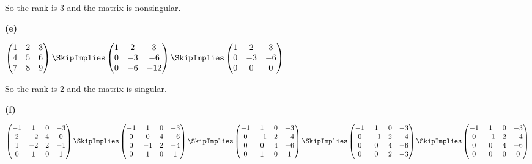\documentclass[oneside,12pt]{amsart}
\begin{document}
\bigskip

So the rank is 3 and the matrix is nonsingular.

\bigskip

\textbf{(e)}

$
\begin{pmatrix}
1 & 2 & 3 \\
4 & 5 & 6 \\
7 & 8 & 9
\end{pmatrix}
\SkipImplies
\begin{pmatrix}
1 & 2 & 3 \\
0 & -3 & -6 \\
0 & -6 & -12
\end{pmatrix}
\SkipImplies
\begin{pmatrix}
1 & 2 & 3 \\
0 & -3 & -6 \\
0 & 0 & 0
\end{pmatrix}
$

\bigskip

So the rank is 2 and the matrix is singular.

\bigskip

\textbf{(f)}

$
\begin{pmatrix}
-1 & 1 & 0 & -3 \\
2 & -2 & 4 & 0 \\
1 & -2 & 2 & -1 \\
0 & 1 & 0 & 1
\end{pmatrix}
\SkipImplies
\begin{pmatrix}
-1 & 1 & 0 & -3 \\
0 & 0 & 4 & -6 \\
0 & -1 & 2 & -4 \\
0 & 1 & 0 & 1
\end{pmatrix}
\SkipImplies
\begin{pmatrix}
-1 & 1 & 0 & -3 \\
0 & -1 & 2 & -4 \\
0 & 0 & 4 & -6 \\
0 & 1 & 0 & 1
\end{pmatrix}
\SkipImplies
\begin{pmatrix}
-1 & 1 & 0 & -3 \\
0 & -1 & 2 & -4 \\
0 & 0 & 4 & -6 \\
0 & 0 & 2 & -3
\end{pmatrix}
\SkipImplies
\begin{pmatrix}
-1 & 1 & 0 & -3 \\
0 & -1 & 2 & -4 \\
0 & 0 & 4 & -6 \\
0 & 0 & 0 & 0
\end{pmatrix}
$
\end{document}
